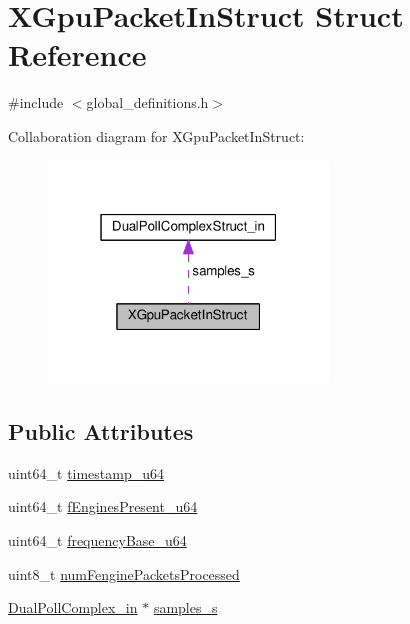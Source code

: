 \hypertarget{struct_x_gpu_packet_in_struct}{}\section{X\+Gpu\+Packet\+In\+Struct Struct Reference}
\label{struct_x_gpu_packet_in_struct}


{\ttfamily \#include $<$global\+\_\+definitions.\+h$>$}



Collaboration diagram for X\+Gpu\+Packet\+In\+Struct\+:\nopagebreak
\begin{figure}[H]
\begin{center}
\leavevmode
\includegraphics[width=211pt]{struct_x_gpu_packet_in_struct__coll__graph}
\end{center}
\end{figure}
\subsection*{Public Attributes}
\begin{DoxyCompactItemize}
\item 
uint64\+\_\+t \hyperlink{struct_x_gpu_packet_in_struct_a3e77083a74a6582d5c3b92c161acdd90}{timestamp\+\_\+u64}
\item 
uint64\+\_\+t \hyperlink{struct_x_gpu_packet_in_struct_aea83ca75c7038265b61ad0da0c7363b8}{f\+Engines\+Present\+\_\+u64}
\item 
uint64\+\_\+t \hyperlink{struct_x_gpu_packet_in_struct_a24ec55c89338104cadc92d84e8c39076}{frequency\+Base\+\_\+u64}
\item 
uint8\+\_\+t \hyperlink{struct_x_gpu_packet_in_struct_af91c1a16261264fedf825dedb28ec037}{num\+Fengine\+Packets\+Processed}
\item 
\hyperlink{global__definitions_8h_a15a16a561045b7779c1db048066fc364}{Dual\+Poll\+Complex\+\_\+in} $\ast$ \hyperlink{struct_x_gpu_packet_in_struct_af64b52e9201cc30d39113a3b888a707e}{samples\+\_\+s}
\end{DoxyCompactItemize}


